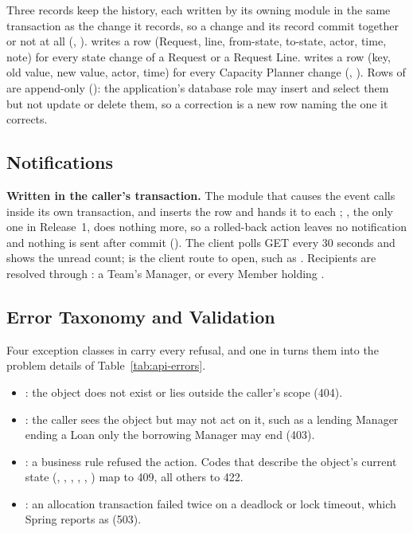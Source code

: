 Three records keep the history, each written by its owning module in the same transaction as the change it records, so a change and its record commit together or not at all (, ).  writes a  row (Request, line, from-state, to-state, actor, time, note) for every state change of a Request or a Request Line.  writes a  row (key, old value, new value, actor, time) for every Capacity Planner change (, ). Rows of  are append-only (): the application's database role may insert and select them but not update or delete them, so a correction is a new row naming the one it corrects.

\subsection{Notifications}

\textbf{Written in the caller's transaction.} The module that causes the event calls  inside its own transaction, and  inserts the row and hands it to each ; , the only one in Release~1, does nothing more, so a rolled-back action leaves no notification and nothing is sent after commit (). The client polls GET  every 30 seconds and shows the unread count;  is the client route to open, such as . Recipients are resolved through : a Team's Manager, or every Member holding .

\subsection{Error Taxonomy and Validation}

Four exception classes in  carry every refusal, and one  in  turns them into the problem details of Table~\ref{tab:api-errors}.

\begin{itemize}
  \item {}: the object does not exist or lies outside the caller's scope (404).
  \item {}: the caller sees the object but may not act on it, such as a lending Manager ending a Loan only the borrowing Manager may end (403).
  \item {}: a business rule refused the action. Codes that describe the object's current state (, , , , , ) map to 409, all others to 422.
  \item {}: an allocation transaction failed twice on a deadlock or lock timeout, which Spring reports as  (503).
\end{itemize}

